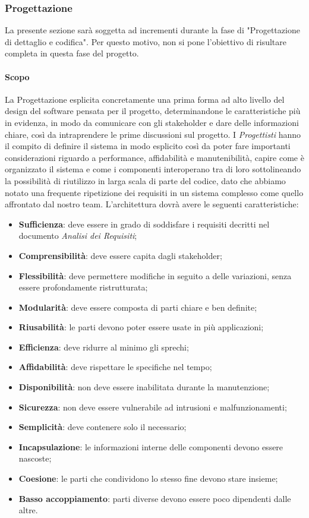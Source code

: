 \subsubsection{Progettazione}
La presente sezione sarà soggetta ad incrementi durante la fase di "Progettazione di dettaglio e codifica". Per questo motivo, non si pone l'obiettivo di risultare completa in questa fase del progetto.
\paragraph{Scopo}\Spazio
La Progettazione esplicita concretamente una prima forma ad alto livello del design del software pensata per il progetto, determinandone le caratteristiche più in evidenza, in modo da comunicare con gli stakeholder e dare delle informazioni chiare, così da intraprendere le prime discussioni sul progetto. I \emph{Progettisti} hanno il compito di definire il sistema in modo esplicito così da poter fare importanti considerazioni riguardo a performance, affidabilità e manutenibilità, capire come è organizzato il sistema  e come i componenti interoperano tra di loro sottolineando la possibilità di riutilizzo in larga scala di parte del codice, dato che abbiamo notato una frequente ripetizione dei requisiti in un sistema complesso come quello affrontato dal nostro team.
L’architettura dovrà avere le seguenti caratteristiche:
	\begin{itemize}
		\item \textbf{Sufficienza}: deve essere in grado di soddisfare i requisiti decritti nel documento \emph{Analisi dei Requisiti};
		\item \textbf{Comprensibilità}: deve essere capita dagli stakeholder;
		\item \textbf{Flessibilità}: deve permettere modifiche in seguito a delle variazioni, senza essere profondamente ristrutturata;
		\item \textbf{Modularità}: deve essere composta di parti chiare e ben definite;
		\item \textbf{Riusabilità}: le parti devono poter essere usate in più applicazioni;
		\item \textbf{Efficienza}: deve ridurre al minimo gli sprechi;
		\item \textbf{Affidabilità}: deve rispettare le specifiche nel tempo;
		\item \textbf{Disponibilità}: non deve essere inabilitata durante la manutenzione;
		\item \textbf{Sicurezza}: non deve essere vulnerabile ad intrusioni e malfunzionamenti;
		\item \textbf{Semplicità}: deve contenere solo il necessario;
		\item \textbf{Incapsulazione}: le informazioni interne delle componenti devono essere nascoste;
		\item \textbf{Coesione}: le parti che condividono lo stesso fine devono stare insieme;
		\item \textbf{Basso accoppiamento}: parti diverse devono essere poco dipendenti dalle altre.
	\end{itemize}
